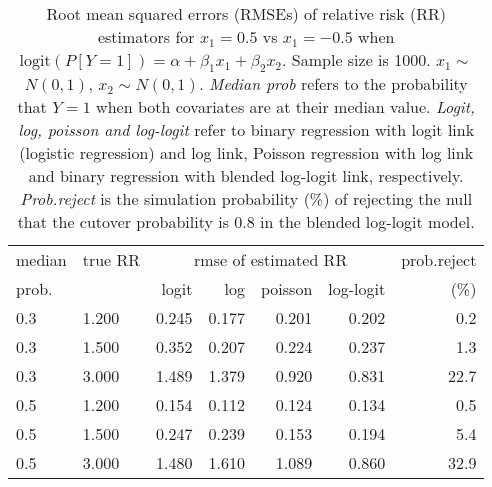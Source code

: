 \documentclass[12pt,a4paper]{article}
\begin{document}
\begin{table}[H] 
\small\sf\centering 
\caption{Root mean squared errors (RMSEs) of relative risk (RR) estimators for $x_1=0.5$ vs $x_1=-0.5$ when $\mbox{logit}(P[Y=1])=\alpha+\beta_1 x_1 + \beta_2 x_2$. Sample size is 1000. $x_1 \sim $$N(0,1)$, $x_2 \sim N(0,1)$. {\it Median prob} refers to the probability that $Y=1$ when both covariates are at their median value. {\it Logit, log, poisson and log-logit} refer to binary regression with logit link (logistic regression) and log link, Poisson regression with log link and binary regression with blended log-logit link, respectively. {\it Prob.reject} is the simulation probability (\%) of rejecting the null that the cutover probability is $0.8$ in the blended log-logit model.} 
\begin{tabular}{llrrrrr} 
\toprule 
median & true RR & \multicolumn{4}{c}{rmse of estimated RR} & prob.reject \\ 
prob. & & logit & log & poisson & log-logit  & (\%) \\ \midrule 
0.3 & 1.200 & 0.245 & 0.177 & 0.201 & 0.202 &  0.2 \\  
0.3 & 1.500 & 0.352 & 0.207 & 0.224 & 0.237 &  1.3 \\  
0.3 & 3.000 & 1.489 & 1.379 & 0.920 & 0.831 & 22.7 \\  
0.5 & 1.200 & 0.154 & 0.112 & 0.124 & 0.134 &  0.5 \\  
0.5 & 1.500 & 0.247 & 0.239 & 0.153 & 0.194 &  5.4 \\  
0.5 & 3.000 & 1.480 & 1.610 & 1.089 & 0.860 & 32.9 \\  
\bottomrule 
\end{tabular} 
\end{table} 
\end{document}
